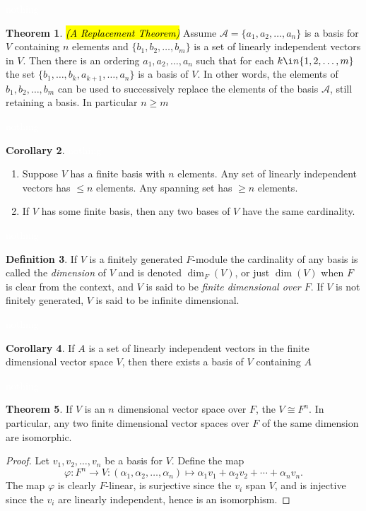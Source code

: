 \documentclass{article}
\theoremstyle{definition}
\newtheorem{thm}{Theorem}[section]
\newtheorem{cor}[thm]{Corollary}
\newtheorem{defn}[thm]{Definition}
\newcommand{\nl}{\textcolor{white}{nothing}}
\newcommand{\ra}{\rightarrow}
\newcommand{\al}{\alpha}
\newcommand{\vphi}{\varphi}
\newcommand{\A}{\mathcal{A}}
\begin{document}
\nl

\begin{thm}\hl{\textit{(A Replacement Theorem)}}
Assume $\A = \{a_1,a_2,\ldots,a_n\}$ is a basis for $V$ containing $n$ elements and $\{b_1,b_2,\ldots, b_m\}$ is a set of linearly independent vectors in $V$. Then there is an ordering $a_1,a_2,\ldots,a_n$ such that for each $k\i n\{1,2,\ldots,m\}$ the set $\{b_1,\ldots, b_k, a_{k+1}, \ldots, a_n\}$ is a basis of $V$. In other words, the elements of $b_1,b_2,\ldots, b_m$ can be used to successively replace the elements of the basis $\A$, still retaining a basis. In particular $n\geq m$
\end{thm}

\nl

\begin{cor}\nl
\begin{enumerate}
\item Suppose $V$ has a finite basis with $n$ elements. Any set of linearly independent vectors has $\leq n$ elements. Any spanning set has $\geq n$ elements.
\item If $V$ has some finite basis, then any two bases of $V$ have the same cardinality.
\end{enumerate}
\end{cor}

\nl

\begin{defn}
If $V$ is a finitely generated $F$-module the cardinality of any basis is called the \textit{dimension} of $V$ and is denoted $\dim_F(V)$, or just $\dim(V)$ when $F$ is clear from the context, and $V$ is said to be \textit{finite dimensional over $F$}. If $V$ is not finitely generated, $V$ is said to be infinite dimensional.
\end{defn}

\nl

\begin{cor}
If $A$ is a set of linearly independent vectors in the finite dimensional vector space $V$, then there exists a basis of $V$ containing $A$
\end{cor}

\nl

\begin{thm}
If $V$ is an $n$ dimensional vector space over $F$, the $V\cong F^n$. In particular, any two finite dimensional vector spaces over $F$ of the same dimension are isomorphic.
\end{thm}

\begin{proof}
Let $v_1,v_2,\ldots,v_n$ be a basis for $V$. Define the map 
\[\vphi:F^n\ra V:(\al_1,\al_2,\ldots,\al_n)\mapsto\al_1v_1 + \al_2v_2+\cdots+\al_n v_n.\]
The map $\vphi$ is clearly $F$-linear, is surjective since the $v_i$ span $V$, and is injective since the $v_i$ are linearly independent, hence is an isomorphism.
\end{proof}
\end{document}
